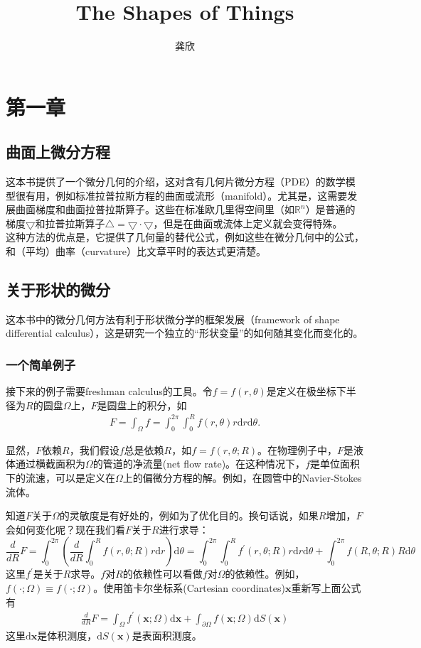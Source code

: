\documentclass[12pt,a4paper]{article}
\title{The Shapes of Things}
\author{龚欣}
\date{\chntoday}
\begin{document}
\maketitle

\section{第一章}
\subsection{曲面上微分方程}
这本书提供了一个微分几何的介绍，这对含有几何片微分方程（PDE）的数学模型很有用，例如标准拉普拉斯方程的曲面或流形（manifold）。尤其是，这需要发展曲面梯度和曲面拉普拉斯算子。这些在标准欧几里得空间里（如$\mathbb{R}^n$）是普通的梯度$\bigtriangledown$和拉普拉斯算子$\bigtriangleup=\bigtriangledown \cdot \bigtriangledown$，但是在曲面或流体上定义就会变得特殊。\\

这种方法的优点是，它提供了几何量的替代公式，例如这些在微分几何中的公式，和（平均）曲率（curvature）比文章平时的表达式更清楚。

\subsection{关于形状的微分}
这本书中的微分几何方法有利于形状微分学的框架发展（framework of shape differential calculus），这是研究一个独立的“形状变量”的如何随其变化而变化的。

\subsubsection{一个简单例子}
接下来的例子需要freshman calculus的工具。令$f=f(r,\theta)$是定义在极坐标下半径为$R$的圆盘$\Omega$上，$F$是圆盘上的积分，如
\begin{gather}
F=\int_{\Omega} f=\int_{0}^{2\pi}\int_{0}^{R} f(r,\theta)r\mathrm{d}r\mathrm{d}\theta.
\end{gather}

显然，$F$依赖$R$，我们假设$f$总是依赖$R$，如$f=f(r,\theta;R)$。在物理例子中，$F$是液体通过横截面积为$\Omega$的管道的净流量(net flow rate)。在这种情况下，$f$是单位面积下的流速，可以是定义在$\Omega$上的偏微分方程的解。例如，在圆管中的Navier-Stokes流体。

知道$F$关于$\Omega$的灵敏度是有好处的，例如为了优化目的。换句话说，如果$R$增加，$F$会如何变化呢？现在我们看$F$关于$R$进行求导：
$$\frac{d}{dR}F=\int_{0}^{2\pi}\left( \frac{d}{dR}\int_{0}^{R}f(r,\theta;R)r\mathrm{d}r \right)\mathrm{d}\theta =\int_{0}^{2\pi}\int_{0}^{R}f^{'}(r,\theta;R)r\mathrm{d}r\mathrm{d}\theta + \int_{0}^{2\pi}f(R,\theta;R)R\mathrm{d}\theta$$
这里$f^{'}$是关于$R$求导。$f$对$R$的依赖性可以看做$f$对$\Omega$的依赖性。例如，$f(\cdot;\Omega)\equiv f(\cdot;\Omega)$。使用笛卡尔坐标系(Cartesian coordinates)$\mathbf{x}$重新写上面公式有
\begin{gather}
\frac{d}{dR}F=\int_{\Omega}f^{'}(\mathbf{x};\Omega)\mathrm{d}\mathbf{x} + \int_{\partial \Omega}f(\mathbf{x};\Omega)\mathrm{d}S(\mathbf{x})
\end{gather}
这里$\mathrm{d}\mathbf{x}$是体积测度，$\mathrm{d}S(\mathbf{x})$是表面积测度。
\end{document}
